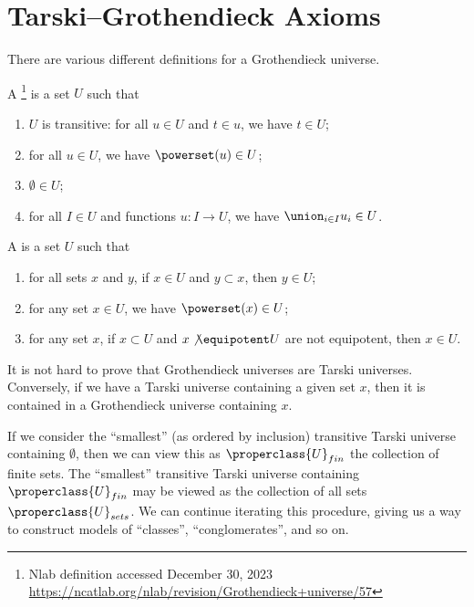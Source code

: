 \section{Tarski--Grothendieck Axioms}

\begin{node}\label{tg-0001}%
There are various different definitions for a Grothendieck universe.
\begin{definition}\label{set:tg-0000}%
A \footnote{Nlab definition accessed
December 30, 2023 \url{https://ncatlab.org/nlab/revision/Grothendieck+universe/57}} is a set $U$ such that
\begin{enumerate}
\item $U$ is transitive: for all $u\in U$ and $t\in u$, we have $t\in U$;
\item for all $u\in U$, we have $\powerset(u)\in U$;
\item $\emptyset\in U$;
\item for all $I\in U$ and functions $u\colon I\to U$, we have
  $\union_{i\in I}u_{i}\in U$.
\end{enumerate}
\end{definition}
\begin{definition}
A  is a set $U$ such that
\begin{enumerate}
\item for all sets $x$ and $y$, if $x\in U$ and $y\subset x$, then $y\in U$;
\item for any set $x\in U$, we have $\powerset(x)\in U$;
\item for any set $x$, if $x\subset U$ and $x\not\equipotent U$ are not equipotent, then $x\in U$.
\end{enumerate}
\begin{node}[Remarks]\label{tg-0002}%
It is not hard to prove that Grothendieck universes are Tarski universes.
Conversely, if we have a Tarski universe containing a given set $x$,
then it is contained in a Grothendieck universe containing $x$.

If we consider the ``smallest'' (as ordered by inclusion) transitive
Tarski universe containing $\emptyset$, then we can view this as
$\properclass{U}_{fin}$ the collection of finite sets. The ``smallest''
transitive Tarski universe containing $\properclass{U}_{fin}$ may be
viewed as the collection of all sets $\properclass{U}_{sets}$. We can
continue iterating this procedure, giving us a way to construct
models of ``classes'', ``conglomerates'', and so on.
\end{node}
\end{definition}
\end{node}
